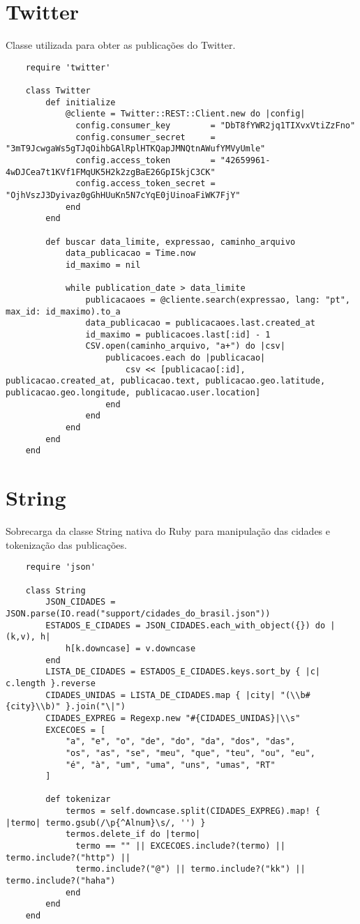 \section{Twitter}

Classe utilizada para obter as publicações do Twitter.

\begin{lstlisting}
	require 'twitter'

	class Twitter
		def initialize
			@cliente = Twitter::REST::Client.new do |config|
			  config.consumer_key        = "DbT8fYWR2jq1TIXvxVtiZzFno"
			  config.consumer_secret     = "3mT9JcwgaWs5gTJqOihbGAlRplHTKQapJMNQtnAWufYMVyUmle"
			  config.access_token        = "42659961-4wDJCea7t1KVf1FMqUK5H2k2zgBaE26GpI5kjC3CK"
			  config.access_token_secret = "OjhVszJ3Dyivaz0gGhHUuKn5N7cYqE0jUinoaFiWK7FjY"
			end
		end

		def buscar data_limite, expressao, caminho_arquivo
			data_publicacao = Time.now
			id_maximo = nil

			while publication_date > data_limite
				publicacaoes = @cliente.search(expressao, lang: "pt", max_id: id_maximo).to_a
				data_publicacao = publicacaoes.last.created_at
				id_maximo = publicacoes.last[:id] - 1
				CSV.open(caminho_arquivo, "a+") do |csv|
					publicacoes.each do |publicacao| 
						csv << [publicacao[:id], publicacao.created_at, publicacao.text, publicacao.geo.latitude, publicacao.geo.longitude, publicacao.user.location]
					end
				end
			end
		end
	end
\end{lstlisting}

\section{String}

Sobrecarga da classe String nativa do Ruby para manipulação das cidades e tokenização das publicações.

\begin{lstlisting}
	require 'json'

	class String
		JSON_CIDADES = JSON.parse(IO.read("support/cidades_do_brasil.json"))
		ESTADOS_E_CIDADES = JSON_CIDADES.each_with_object({}) do |(k,v), h|
			h[k.downcase] = v.downcase
		end
		LISTA_DE_CIDADES = ESTADOS_E_CIDADES.keys.sort_by { |c| c.length }.reverse
		CIDADES_UNIDAS = LISTA_DE_CIDADES.map { |city| "(\\b#{city}\\b)" }.join("\|")
		CIDADES_EXPREG = Regexp.new "#{CIDADES_UNIDAS}|\\s"
		EXCECOES = [
			"a", "e", "o", "de", "do", "da", "dos", "das", 
			"os", "as", "se", "meu", "que", "teu", "ou", "eu",
			"é", "à", "um", "uma", "uns", "umas", "RT"
		]

		def tokenizar
			termos = self.downcase.split(CIDADES_EXPREG).map! { |termo| termo.gsub(/\p{^Alnum}\s/, '') }
			termos.delete_if do |termo| 
			  termo == "" || EXCECOES.include?(termo) || termo.include?("http") || 
			  termo.include?("@") || termo.include?("kk") || termo.include?("haha")
			end
		end
	end
\end{lstlisting}

